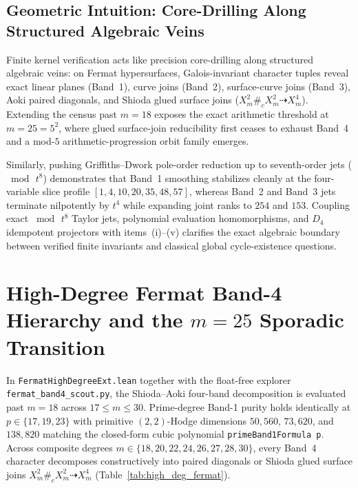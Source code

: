 \documentclass[11pt,a4paper]{article}
\begin{document}
\subsection{Geometric Intuition: Core-Drilling Along Structured Algebraic Veins}

Finite kernel verification acts like precision core-drilling along structured algebraic veins: on Fermat hypersurfaces, Galois-invariant character tuples reveal exact linear planes (Band~1), curve joins (Band~2), surface-curve joins (Band~3), Aoki paired diagonals, and Shioda glued surface joins ($X_m^2 \#_c X_m^2 \dashrightarrow X_m^4$). Extending the census past $m = 18$ exposes the exact arithmetic threshold at $m = 25 = 5^2$, where glued surface-join reducibility first ceases to exhaust Band~4 and a mod-$5$ arithmetic-progression orbit family emerges.

Similarly, pushing Griffiths--Dwork pole-order reduction up to seventh-order jets ($\bmod\, t^8$) demonstrates that Band~1 smoothing stabilizes cleanly at the four-variable slice profile $[1, 4, 10, 20, 35, 48, 57]$, whereas Band~2 and Band~3 jets terminate nilpotently by $t^4$ while expanding joint ranks to $254$ and $153$. Coupling exact $\bmod\, t^8$ Taylor jets, polynomial evaluation homomorphisms, and $D_4$ idempotent projectors with items~(i)--(v) clarifies the exact algebraic boundary between verified finite invariants and classical global cycle-existence questions.

\section{High-Degree Fermat Band-4 Hierarchy and the $m = 25$ Sporadic Transition}

In \texttt{FermatHighDegreeExt.lean} together with the float-free explorer \texttt{fermat\_band4\_scout.py}, the Shioda--Aoki four-band decomposition is evaluated past $m = 18$ across $17 \le m \le 30$. Prime-degree Band-1 purity holds identically at $p \in \{17, 19, 23\}$ with primitive $(2,2)$-Hodge dimensions $50{,}560$, $73{,}620$, and $138{,}820$ matching the closed-form cubic polynomial \texttt{primeBand1Formula p}. Across composite degrees $m \in \{18, 20, 22, 24, 26, 27, 28, 30\}$, every Band~4 character decomposes constructively into paired diagonals or Shioda glued surface joins $X_m^2 \#_c X_m^2 \dashrightarrow X_m^4$ (Table~\ref{tab:high_deg_fermat}).
\end{document}
